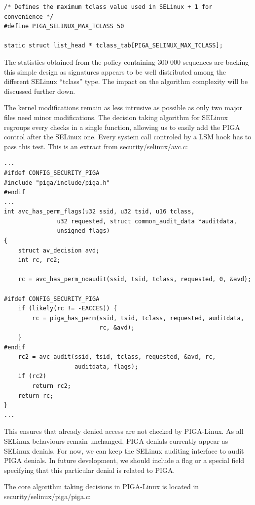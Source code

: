 \documentclass[pdftex,a4paper,titlepage,11pt]{article}
\begin{document}
\begin{lstlisting}
/* Defines the maximum tclass value used in SELinux + 1 for convenience */
#define PIGA_SELINUX_MAX_TCLASS 50

static struct list_head * tclass_tab[PIGA_SELINUX_MAX_TCLASS];
\end{lstlisting}

\medskip

The statistics obtained from the policy containing 300 000 sequences are
backing this simple design as signatures appears to be well distributed among
the different SELinux ``tclass'' type. The impact on the algorithm complexity
will be discussed further down.

\bigskip

The kernel modifications remain as less intrusive as possible as only two
major files need minor modifications. The decision taking algorithm for SELinux
regroups every checks in a single function, allowing us to easily add the PIGA
control after the SELinux one. Every system call controled by a LSM hook has
to pass this test. This is an extract from security/selinux/avc.c:

\begin{lstlisting}
...
#ifdef CONFIG_SECURITY_PIGA
#include "piga/include/piga.h"
#endif
...
int avc_has_perm_flags(u32 ssid, u32 tsid, u16 tclass,
		       u32 requested, struct common_audit_data *auditdata,
		       unsigned flags)
{
	struct av_decision avd;
	int rc, rc2;

	rc = avc_has_perm_noaudit(ssid, tsid, tclass, requested, 0, &avd);

#ifdef CONFIG_SECURITY_PIGA
	if (likely(rc != -EACCES)) {
		rc = piga_has_perm(ssid, tsid, tclass, requested, auditdata,
						   rc, &avd);
	}
#endif
	rc2 = avc_audit(ssid, tsid, tclass, requested, &avd, rc,
					auditdata, flags);
	if (rc2)
		return rc2;
	return rc;
}
...
\end{lstlisting}

\medskip

This ensures that already denied access are not checked by PIGA-Linux. As all
SELinux behaviours remain unchanged, PIGA denials currently appear as SELinux
denials. For now, we can keep the SELinux auditing interface to audit PIGA
denials. In future development, we should include a flag or a special field
specifying that this particular denial is related to PIGA.

\bigskip

The core algorithm taking decisions in PIGA-Linux is located in
security/selinux/piga/piga.c:
\end{document}
